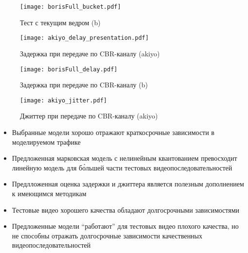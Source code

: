     \begin{figure}[h]
        \begin{center}
            \texttt{[image: borisFull\_bucket.pdf]}
        \end{center}
        \caption{Тест с текущим ведром (b)}
    \end{figure}

    \begin{figure}[h]
        \begin{center}
            \texttt{[image: akiyo\_delay\_presentation.pdf]}
        \end{center}
        \caption{Задержка при передаче по CBR-каналу (akiyo)}
    \end{figure}

    \begin{figure}[h]
        \begin{center}
            \texttt{[image: borisFull\_delay.pdf]}
        \end{center}
        \caption{Задержка при передаче по CBR-каналу (b)}
    \end{figure}

    \begin{figure}[h]
        \begin{center}
            \texttt{[image: akiyo\_jitter.pdf]}
        \end{center}
        \caption{Джиттер при передаче по CBR-каналу (akiyo)}
    \end{figure}

    \begin{itemize}
        \item Выбранные модели хорошо отражают краткосрочные
            зависимости в моделируемом трафике
        \item Предложенная марковская модель с нелинейным квантованием
            превосходит линейную модель для б\`{о}льшей части
            тестовых видеопоследовательностей
        \item Предлложенная оценка задержки и джиттера является
            полезным дополнением к имеющимся методикам
        \item Тестовые видео хорошего качества обладают
            долгосрочными зависимостями
        \item Предложенные модели ``работают'' для тестовых
            видео плохого качества, но не способны отражать
            долгосрочные зависимости качественных видеопоследовательностей
    \end{itemize}

